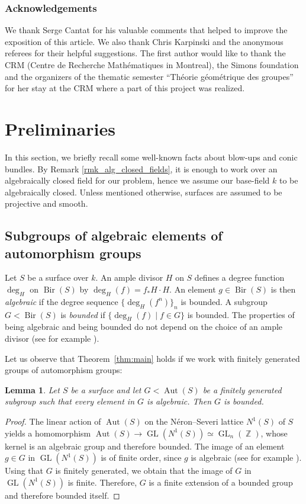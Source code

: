 \documentclass[JEP,XML,SOM,Unicode, NoEqCountersInSection,published]{cedram}
\newcommand{\GL}{\operatorname{GL}}
\newcommand{\Z}{\operatorname{\mathbb{Z}}}
\newcommand{\Aut}{\operatorname{Aut}}
\newcommand{\Bir}{\operatorname{Bir}}
\theoremstyle{plain}
\newtheorem{lemma}[theorem]{Lemma}
\theoremstyle{definition}
\begin{document}
\subsubsection*{Acknowledgements}
We thank Serge Cantat for his valuable comments that helped to improve the exposition of this article. {We also thank Chris Karpinski and the anonymous referees for their helpful suggestions.}
The first author would like to thank the CRM (Centre de Recherche Mathématiques in Montreal), the Simons foundation and the organizers of the thematic semester ``Théorie géométrique des groupes'' for her stay at the CRM where a part of this project was realized.

\section{Preliminaries}
In this section, we briefly recall some well-known facts about blow-ups and conic bundles. {By Remark \ref{rmk_alg_closed_fields}, it is enough to work over an algebraically closed field for our problem, hence} we assume our base-field $k$ to be algebraically closed. Unless mentioned otherwise, surfaces are assumed to be projective and smooth.

\subsection{Subgroups of algebraic elements of automorphism groups}
{Let $S$ be a surface over $k$.} An ample divisor $H$ on $S$ defines a degree function $\deg_H$ on $\Bir(S)$ by $\deg_H(f)=f_*H\cdot H$. An element $g\in \Bir(S)$ is then \emph{algebraic} if the degree sequence $\{\deg_H(f^n)\}_n$ is bounded. A subgroup $G<\Bir(S)$ is \emph{bounded} if $\{\deg_H(f)\mid f\in G\}$ is bounded. The properties of being algebraic and being bounded do not depend on the choice of an ample divisor (see for example \cite{MR4133708}).

Let us observe that Theorem~\ref{thm:main} holds if we work with finitely generated groups of automorphism groups:

\begin{lemma}\label{lem:aut}
Let $S$ be a
surface and let $G<\Aut(S)$ be a finitely generated subgroup such that every element in $G$ is algebraic. Then $G$ is bounded.
\end{lemma}

\begin{proof}
The linear action of $\Aut(S)$ on the Néron--Severi lattice $N^1(S)$ of $S$ yields a homomorphism $\Aut(S)\to\GL(N^1(S))\simeq \GL_n(\Z)$, whose kernel is an algebraic group and therefore bounded. The image of an element $g\in G$ in $\GL(N^1(S))$ is of finite order, since $g$ is algebraic (see for example \cite[Th.\,4.6]{cantat2015cremona}). Using that $G$ is finitely generated, we obtain that the image of $G$ in $\GL(N^1(S))$ is finite. Therefore, $G$ is a finite extension of a bounded group and therefore bounded itself.
\end{proof}
\end{document}
